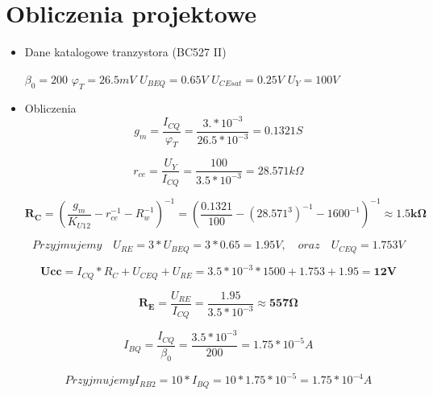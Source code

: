 \documentclass[a4paper,12pt]{article}
\begin{document}
\section{Obliczenia projektowe}
\begin{itemize}
 \item Dane katalogowe tranzystora (BC527 II)

 $\beta_0  = 200 $\newline
 $\varphi_T = 26.5mV$ \newline
 $U_{BEQ}=0.65V$ \newline
 $U_{CEsat}=0.25V$ \newline
 $U_Y = 100V$
 
 \item Obliczenia
\begin{equation}
g_m = \frac{I_{CQ}}{\varphi_T} = \frac{3.*10^{-3}}{26.5*10^{-3}} = 0.1321S
\end{equation}

\begin{equation}
r_{ce} = \frac{U_Y}{I_{CQ}} = \frac{100}{3.5*10^{-3}} = 28.571k\Omega
\end{equation}

\begin{equation}
\mathbf{R_C} = (\frac{g_m}{K_{U12}} - r_{ce}^{-1} - R_w^{-1})^{-1} = (\frac{0.1321}{100} - (28.571^3)^{-1} - 1600^{-1})^{-1} \approx \mathbf{1.5 k\Omega}
\end{equation}

\begin{equation}
Przyjmujemy \quad U_{RE} = 3*U_{BEQ} = 3*0.65 = 1.95V, \quad oraz \quad U_{CEQ} = 1.753V
\end{equation}

\begin{equation}
\mathbf{Ucc} = I_{CQ}*R_C + U_{CEQ} + U_{RE} = 3.5*10^{-3}*1500 + 1.753 + 1.95 = \mathbf{12V}
\end{equation}

\begin{equation}
\mathbf{R_E} = \frac{U_{RE}}{I_{CQ}} = \frac{1.95}{3.5*10^{-3}} \approx \mathbf{557\Omega}
\end{equation}

\begin{equation}
I_{BQ} = \frac{I_{CQ}}{\beta_0} = \frac{3.5*10^{-3}}{200} = 1.75*10^{-5}A
\end{equation}

\begin{equation}
Przyjmujemy I_{RB2} = 10*I_{BQ} = 10 * 1.75*10^{-5} = 1.75*10^{-4}A
\end{equation}


\end{itemize}
\end{document}
